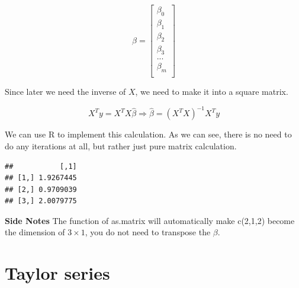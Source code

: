 \documentclass[
]{book}
\newenvironment{Shaded}{\begin{snugshade}}{\end{snugshade}}
\newcommand{\CommentTok}[1]{\textcolor[rgb]{0.56,0.35,0.01}{\textit{#1}}}
\newcommand{\DataTypeTok}[1]{\textcolor[rgb]{0.13,0.29,0.53}{#1}}
\newcommand{\DecValTok}[1]{\textcolor[rgb]{0.00,0.00,0.81}{#1}}
\newcommand{\KeywordTok}[1]{\textcolor[rgb]{0.13,0.29,0.53}{\textbf{#1}}}
\newcommand{\NormalTok}[1]{#1}
\newcommand{\OperatorTok}[1]{\textcolor[rgb]{0.81,0.36,0.00}{\textbf{#1}}}
\begin{document}
\[\beta = \begin{bmatrix}\beta_0 \\
\beta_1 \\
\beta_2 \\
\beta_3 \\
...\\
\beta_m \\
\end{bmatrix}\]

Since later we need the inverse of \(X\), we need to make it into a square matrix.

\[X^Ty=X^TX \hat{\beta} \Rightarrow \hat{\beta} = (X^TX)^{-1} X^Ty\]

We can use R to implement this calculation. As we can see, there is no need to do any iterations at all, but rather just pure matrix calculation.

\begin{Shaded}
\end{Shaded}

\begin{verbatim}
##           [,1]
## [1,] 1.9267445
## [2,] 0.9709039
## [3,] 2.0079775
\end{verbatim}

\textbf{Side Notes}
The function of as.matrix will automatically make c(2,1,2) become the dimension of \(3 \times 1\), you do not need to transpose the \(\beta\).

\hypertarget{taylor-series}{%
\section{Taylor series}\label{taylor-series}}
\end{document}
